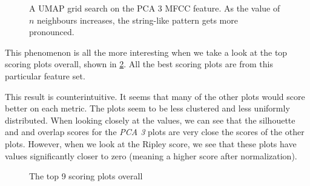 \documentclass[a4paper, 12pt, twoside]{report}
\begin{document}
\begin{figure}[h!tbp]
\centering
{}
\caption{A UMAP grid search on the PCA 3 MFCC feature. As the value of $n$ neighbours increases, the string-like pattern gets more pronounced.}
\label{fig:umap_3d_pca_grid_search}
\end{figure}

This phenomenon is all the more interesting when we take a look at the top scoring plots overall, shown in \ref{fig:top_overall}. All the best scoring plots are from this particular feature set.

This result is counterintuitive. It seems that many of the other plots would score better on each metric. The plots seem to be less clustered and less uniformly distributed. When looking closely at the values, we can see that the silhouette and and overlap scores for the \textit{PCA 3} plots are very close the scores of the other plots. However, when we look at the Ripley score, we see that these plots have values significantly closer to zero (meaning a higher score after normalization).

\begin{figure}[h!tbp]
\centering
{}
\caption{The top 9 scoring plots overall}
\label{fig:top_overall}
\end{figure}
\end{document}
